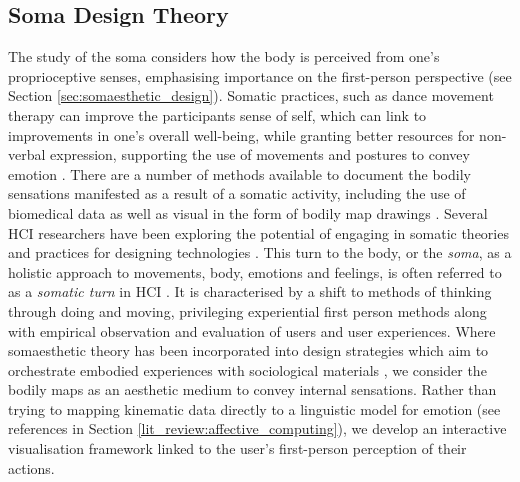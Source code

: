 \subsection*{Soma Design Theory}
The study of the soma considers how the body is perceived from one's proprioceptive senses, emphasising importance on the first-person perspective (see Section \ref{sec:somaesthetic_design}). Somatic practices, such as dance movement therapy can improve the participants sense of self, which can link to improvements in one's overall well-being,
while granting better resources for non-verbal expression, supporting the use of movements and postures to convey emotion \cite{samaritter_aesthetic_2018}. There are a number of methods available to document the bodily sensations manifested as a result of a somatic activity, including the use of biomedical data \cite{hook_soma_2019} as well as visual in the form of bodily map drawings \cite{windlin_soma_2019}.
Several HCI researchers have been exploring the potential of engaging in somatic theories and practices for designing technologies \cite{hook_somaesthetic_2016}. This turn to the body, or the \textit{soma}, as a holistic approach to movements, body, emotions and feelings, is often referred to as a \textit{somatic turn} in HCI \cite{loke_somatic_2018}. It is characterised by a shift to methods of thinking through doing and moving, privileging experiential first person methods \cite{hook_embracing_2018} along with empirical observation and evaluation of users and user experiences.
Where somaesthetic theory has been incorporated into design strategies which aim to orchestrate embodied experiences with sociological materials \cite{tsaknaki_teaching_2019}, we consider the bodily maps as an aesthetic medium to convey internal sensations. Rather than trying to mapping kinematic data directly to a linguistic model for emotion (see references in Section \ref{lit_review:affective_computing}), we develop an interactive visualisation framework linked to the user's first-person perception of their actions.


